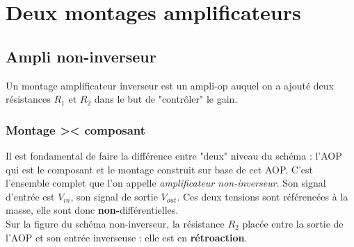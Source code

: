 \documentclass	[11pt, a4paper, openany]{book}
\begin{document}
\section{Deux montages amplificateurs}
\subsection{Ampli non-inverseur}
Un montage amplificateur inverseur est un ampli-op auquel on a ajouté deux résistances $R_1$ et $R_2$ dans le but de "contrôler" le gain. 

\subsubsection{Montage >< composant}
Il est fondamental de faire la différence entre "deux" niveau du schéma : l'AOP qui est le composant et le montage construit sur base de cet AOP. C'est l'ensemble complet que l'on appelle \textit{amplificateur non-inverseur}. Son signal d'entrée est $V_{in}$, son signal de sortie $V_{out}$. Ces deux tensions sont référencées à la masse, elle sont donc \textbf{non-}différentielles.\\

Sur la figure du schéma non-inverseur, la résistance $R_2$ placée entre la sortie de l'AOP et son entrée inverseuse : elle est en \textbf{rétroaction}. 
\end{document}
